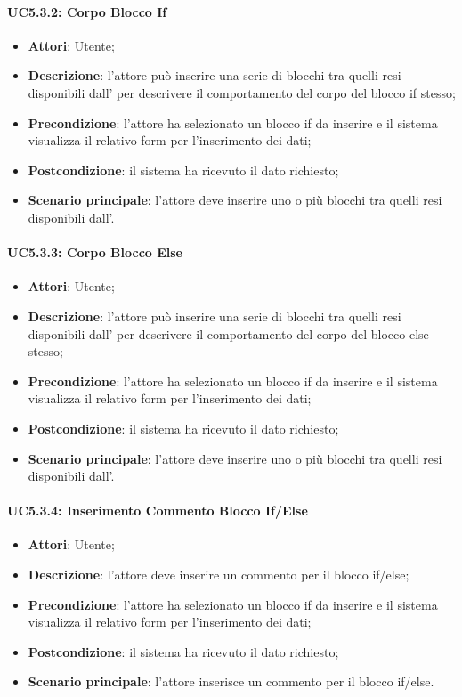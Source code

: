 \paragraph{UC5.3.2: Corpo Blocco If}
\label{UC5.3.2}
\begin{itemize}
	\item \textbf{Attori}: Utente;
	\item \textbf{Descrizione}: l'attore può inserire una serie di blocchi tra quelli resi disponibili dall' per descrivere il comportamento del corpo del blocco if stesso;
	\item \textbf{Precondizione}: l'attore ha selezionato un blocco if da inserire e il sistema visualizza il relativo form per l'inserimento dei dati;
	\item \textbf{Postcondizione}: il sistema ha ricevuto il dato richiesto;
	\item \textbf{Scenario principale}: l'attore deve inserire uno o più blocchi tra quelli resi disponibili dall'.
\end{itemize}

\paragraph{UC5.3.3: Corpo Blocco Else}
\label{UC5.3.3}
\begin{itemize}
	\item \textbf{Attori}: Utente;
	\item \textbf{Descrizione}: l'attore può inserire una serie di blocchi tra quelli resi disponibili dall' per descrivere il comportamento del corpo del blocco else stesso;
	\item \textbf{Precondizione}: l'attore ha selezionato un blocco if da inserire e il sistema visualizza il relativo form per l'inserimento dei dati;
	\item \textbf{Postcondizione}: il sistema ha ricevuto il dato richiesto;
	\item \textbf{Scenario principale}: l'attore deve inserire uno o più blocchi tra quelli resi disponibili dall'.
\end{itemize}

\paragraph{UC5.3.4: Inserimento Commento Blocco If/Else}
\label{UC5.3.4}
\begin{itemize}
	\item \textbf{Attori}: Utente;
	\item \textbf{Descrizione}: l'attore deve inserire un commento per il blocco if/else;
	\item \textbf{Precondizione}: l'attore ha selezionato un blocco if da inserire e il sistema visualizza il relativo form per l'inserimento dei dati;
	\item \textbf{Postcondizione}: il sistema ha ricevuto il dato richiesto;
	\item \textbf{Scenario principale}: l'attore inserisce un commento per il blocco if/else.
\end{itemize}

